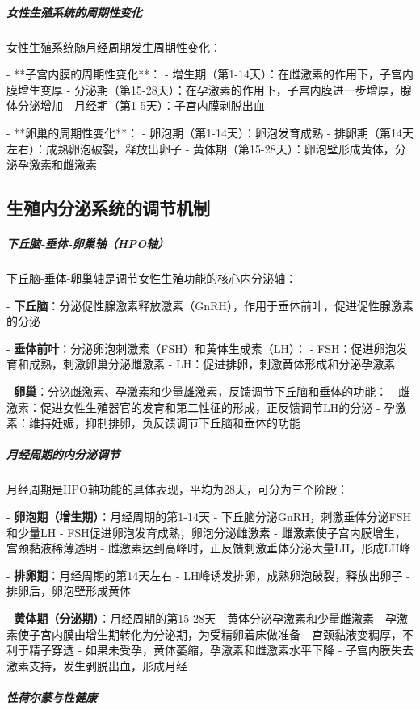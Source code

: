 \begin{enumerate}
\subparagraph{女性生殖系统的周期性变化}

女性生殖系统随月经周期发生周期性变化：

- **子宫内膜的周期性变化**：
  - 增生期（第1-14天）：在雌激素的作用下，子宫内膜增生变厚
  - 分泌期（第15-28天）：在孕激素的作用下，子宫内膜进一步增厚，腺体分泌增加
  - 月经期（第1-5天）：子宫内膜剥脱出血

- **卵巢的周期性变化**：
  - 卵泡期（第1-14天）：卵泡发育成熟
  - 排卵期（第14天左右）：成熟卵泡破裂，释放出卵子
  - 黄体期（第15-28天）：卵泡壁形成黄体，分泌孕激素和雌激素

\subsection{生殖内分泌系统的调节机制}

\subparagraph{下丘脑-垂体-卵巢轴（HPO轴）}

下丘脑-垂体-卵巢轴是调节女性生殖功能的核心内分泌轴：

- \textbf{下丘脑}：分泌促性腺激素释放激素（GnRH），作用于垂体前叶，促进促性腺激素的分泌

- \textbf{垂体前叶}：分泌卵泡刺激素（FSH）和黄体生成素（LH）：
  - FSH：促进卵泡发育和成熟，刺激卵巢分泌雌激素
  - LH：促进排卵，刺激黄体形成和分泌孕激素

- \textbf{卵巢}：分泌雌激素、孕激素和少量雄激素，反馈调节下丘脑和垂体的功能：
  - 雌激素：促进女性生殖器官的发育和第二性征的形成，正反馈调节LH的分泌
  - 孕激素：维持妊娠，抑制排卵，负反馈调节下丘脑和垂体的功能

\subparagraph{月经周期的内分泌调节}

月经周期是HPO轴功能的具体表现，平均为28天，可分为三个阶段：

- \textbf{卵泡期（增生期）}：月经周期的第1-14天
  - 下丘脑分泌GnRH，刺激垂体分泌FSH和少量LH
  - FSH促进卵泡发育成熟，卵泡分泌雌激素
  - 雌激素使子宫内膜增生，宫颈黏液稀薄透明
  - 雌激素达到高峰时，正反馈刺激垂体分泌大量LH，形成LH峰

- \textbf{排卵期}：月经周期的第14天左右
  - LH峰诱发排卵，成熟卵泡破裂，释放出卵子
  - 排卵后，卵泡壁形成黄体

- \textbf{黄体期（分泌期）}：月经周期的第15-28天
  - 黄体分泌孕激素和少量雌激素
  - 孕激素使子宫内膜由增生期转化为分泌期，为受精卵着床做准备
  - 宫颈黏液变稠厚，不利于精子穿透
  - 如果未受孕，黄体萎缩，孕激素和雌激素水平下降
  - 子宫内膜失去激素支持，发生剥脱出血，形成月经

\subparagraph{性荷尔蒙与性健康}


\end{enumerate}
